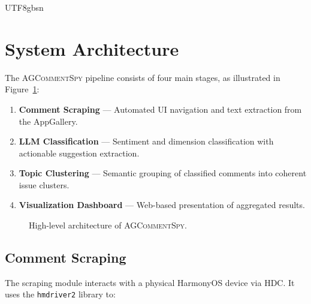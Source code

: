 \documentclass[11pt,a4paper]{article}
\begin{document}
\begin{CJK*}{UTF8}{gbsn}
\section{System Architecture}

The \textsc{AGCommentSpy} pipeline consists of four main stages, as illustrated in Figure~\ref{fig:architecture}:

\begin{enumerate}[nosep]
  \item \textbf{Comment Scraping} --- Automated UI navigation and text extraction from the AppGallery.
  \item \textbf{LLM Classification} --- Sentiment and dimension classification with actionable suggestion extraction.
  \item \textbf{Topic Clustering} --- Semantic grouping of classified comments into coherent issue clusters.
  \item \textbf{Visualization Dashboard} --- Web-based presentation of aggregated results.
\end{enumerate}

\begin{figure}[H]
\centering
{}
\caption{High-level architecture of \textsc{AGCommentSpy}.}
\label{fig:architecture}
\end{figure}


\subsection{Comment Scraping}

The scraping module interacts with a physical HarmonyOS device via HDC. It uses the \texttt{hmdriver2} library to:


\end{CJK*}
\end{document}
